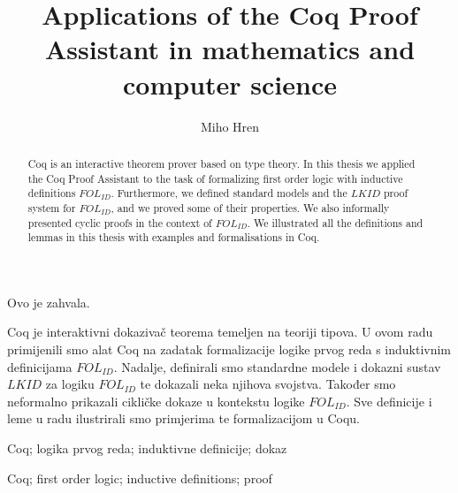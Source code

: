\documentclass[diplomskirad, upload]{fer}
\title{Applications of the Coq Proof Assistant in mathematics and computer science}
\author{Miho Hren}
\theoremstyle{definition}
\theoremstyle{remark}
\begin{document}
\maketitle
{}

\begin{zahvale}
  Ovo je zahvala.
\end{zahvale}

\mainmatter{}

\tableofcontents










\begin{sazetak}
  Coq je interaktivni dokazivač teorema temeljen na teoriji tipova.
  U ovom radu primijenili smo alat Coq na zadatak formalizacije
  logike prvog reda s induktivnim definicijama \(\mathit{FOL}_{\mathit{ID}}\). Nadalje,
  definirali smo standardne modele i dokazni sustav \(\mathit{LKID}\) za logiku \(\mathit{FOL}_{\mathit{ID}}\) te
  dokazali neka njihova svojstva. Također smo neformalno prikazali cikličke dokaze
  u kontekstu logike \(\mathit{FOL}_{\mathit{ID}}\).
  Sve definicije i leme u radu ilustrirali smo primjerima te formalizacijom u Coqu.  
\end{sazetak}

\begin{kljucnerijeci}
  Coq; logika prvog reda; induktivne definicije; dokaz
\end{kljucnerijeci}

\begin{abstract}
  Coq is an interactive theorem prover based on type theory.
  In this thesis we applied the Coq Proof Assistant to the task of formalizing
  first order logic with inductive definitions \(\mathit{FOL}_{\mathit{ID}}\). Furthermore,
  we defined standard models and the \(\mathit{LKID}\) proof system for \(\mathit{FOL}_{\mathit{ID}}\),
  and we proved some of their properties. We also informally presented cyclic proofs in the context of \(\mathit{FOL}_{\mathit{ID}}\).
  We illustrated all the definitions and lemmas in this thesis with examples and formalisations in Coq.
\end{abstract}

\begin{keywords}
  Coq; first order logic; inductive definitions; proof
\end{keywords}


\backmatter{}
\end{document}
